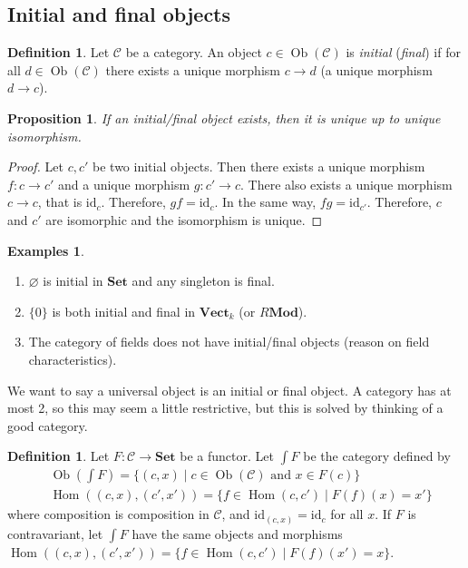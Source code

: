 \documentclass{article}
\newcommand{\id}{\mathrm{id}}
\newcommand{\cat}{\mathcal{C}}
\newcommand{\Set}{\mathbf{Set}}
\newcommand{\Mod}{\mathbf{Mod}}
\newcommand{\Vectcat}{\mathbf{Vect}}
\DeclareMathOperator{\Ob}{Ob}
\DeclareMathOperator{\Hom}{Hom}
\newcommand{\esh}{{\textstyle \int}}
\theoremstyle{plain}
\newtheorem{proposition}[theorem]{Proposition}
\theoremstyle{definition}
\newtheorem{definition}[theorem]{Definition}
\newtheorem{examples}[theorem]{Examples}
\theoremstyle{remark}
\begin{document}
\subsection{Initial and final objects}
\begin{definition}
    Let $\cat$ be a category. An object $c \in \Ob(\cat)$ is \emph{initial} (\emph{final}) if for all $d \in \Ob(\cat)$ there exists a unique morphism $c \to d$ (a unique morphism $d \to c$).
\end{definition}
\begin{proposition}
    If an initial/final object exists, then it is unique up to unique isomorphism.
\end{proposition}
\begin{proof}
    Let $c,c'$ be two initial objects. Then there exists a unique morphism $f : c \to c'$ and a unique morphism $g : c' \to c$. There also exists a unique morphism $c \to c$, that is $\id_c$. Therefore, $gf = \id_c$. In the same way, $fg = \id_{c'}$. Therefore, $c$ and $c'$ are isomorphic and the isomorphism is unique.
\end{proof}
\begin{examples} \leavevmode
    \begin{enumerate}
        \item $\varnothing$ is initial in $\Set$ and any singleton is final.
        \item $\{0\}$ is both initial and final in $\Vectcat_k$ (or $R\Mod$).
        \item The category of fields does not have initial/final objects (reason on field characteristics).
    \end{enumerate}
\end{examples}

We want to say a universal object is an initial or final object. A category has at most 2, so this may seem a little restrictive, but this is solved by thinking of a good category.
\begin{definition}
    Let $F : \cat \to \Set$ be a functor. Let $\esh F$ be the category defined by
    \begin{align*}
        & \Ob(\esh F) = \{(c,x) \mid c \in \Ob(\cat) \text{ and } x \in F(c)\} \\
        & \Hom((c,x),(c',x')) = \{f \in \Hom(c,c') \mid F(f)(x) = x'\}
    \end{align*}
    where composition is composition in $\cat$, and $\id_{(c,x)} = \id_c$ for all $x$. If $F$ is contravariant, let $\esh F$ have the same objects and morphisms $\Hom((c,x),(c',x')) = \{f \in \Hom(c,c') \mid F(f)(x') = x\}$.
\end{definition}
\end{document}
